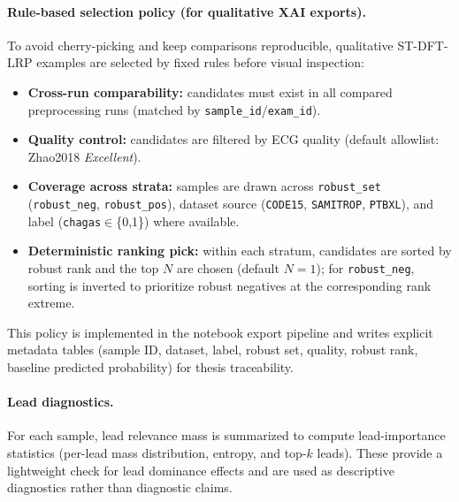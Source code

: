 \paragraph{Rule-based selection policy (for qualitative XAI exports).}
\label{sec:xai_rule_policy}
To avoid cherry-picking and keep comparisons reproducible, qualitative ST-DFT-LRP examples are selected by fixed rules before visual inspection:
\begin{itemize}
  \item \textbf{Cross-run comparability:} candidates must exist in all compared preprocessing runs (matched by \texttt{sample\_id}/\texttt{exam\_id}).
  \item \textbf{Quality control:} candidates are filtered by ECG quality (default allowlist: Zhao2018 \textit{Excellent}).
  \item \textbf{Coverage across strata:} samples are drawn across \texttt{robust\_set} (\texttt{robust\_neg}, \texttt{robust\_pos}), dataset source (\texttt{CODE15}, \texttt{SAMITROP}, \texttt{PTBXL}), and label (\texttt{chagas}\(\in\)\{0,1\}) where available.
  \item \textbf{Deterministic ranking pick:} within each stratum, candidates are sorted by robust rank and the top \(N\) are chosen (default \(N=1\)); for \texttt{robust\_neg}, sorting is inverted to prioritize robust negatives at the corresponding rank extreme.
\end{itemize}
This policy is implemented in the notebook export pipeline and writes explicit metadata tables (sample ID, dataset, label, robust set, quality, robust rank, baseline predicted probability) for thesis traceability.

\paragraph{Lead diagnostics.}
For each sample, lead relevance mass is summarized to compute lead-importance statistics (per-lead mass distribution, entropy, and top-$k$ leads).
These provide a lightweight check for lead dominance effects and are used as descriptive diagnostics rather than diagnostic claims.

